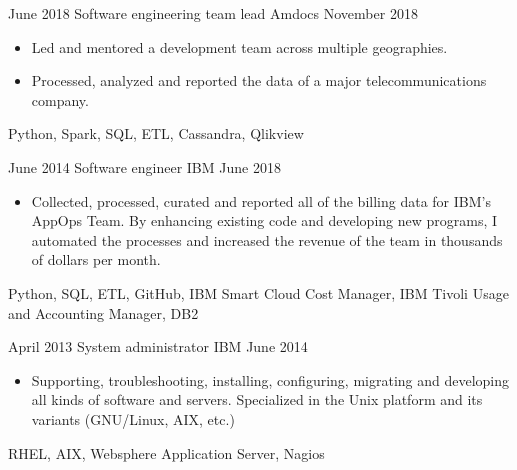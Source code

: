\begin{experiences}
    \emptySeparator

    \experience
        {June 2018}
        {Software engineering team lead}
        {Amdocs}
        {November 2018}
        {
            \begin{itemize}
                \item Led and mentored a development team across multiple 
                geographies.
                \item Processed, analyzed and reported 
                the data of a major telecommunications company.
            \end{itemize}
        }
        {
            Python,
            Spark,
            SQL,
            ETL,
            Cassandra,
            Qlikview
        }

    \emptySeparator

    \experience
        {June 2014}
        {Software engineer}
        {IBM}
        {June 2018}
        {
            \begin{itemize}
                \item Collected, processed, curated and reported all of the 
                    billing data for IBM's AppOps Team. By enhancing existing 
                    code and developing new programs, I automated the processes 
                    and increased the revenue of the team in thousands of 
                    dollars per month.
            \end{itemize}
        }
        {
            Python,
            SQL,
            ETL,
            GitHub,
            IBM Smart Cloud Cost Manager,
            IBM Tivoli Usage and Accounting Manager,
            DB2
        }

    \emptySeparator

    \experience
        {April 2013}
        {System administrator}
        {IBM}
        {June 2014}
        {
            \begin{itemize}
                \item Supporting, troubleshooting, installing, configuring, 
                    migrating and developing all kinds of software and servers. 
                    Specialized in the Unix platform and its variants 
                    (GNU/Linux, AIX, etc.)
            \end{itemize}
        }
        {
            RHEL,
            AIX,
            Websphere Application Server,
            Nagios
        }

    \emptySeparator


\end{experiences}
